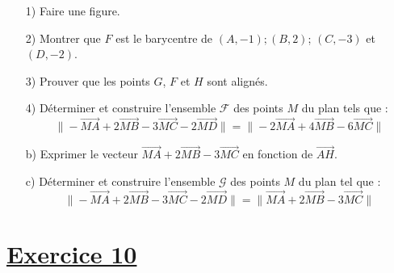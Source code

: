 \documentclass[12pt]{article}
\begin{document}
\begin{enumerate}
    \item[1)] Faire une figure.
    \item[2)] Montrer que \( F \) est le barycentre de \( (A, -1); (B, 2) \); \( (C, -3) \) et \( (D, -2) \).
    \item[3)] Prouver que les points \( G \), \( F \) et \( H \) sont alignés.
    \item[4)] Déterminer et construire l'ensemble \( \mathcal{F} \) des points \( M \) du plan tels que :
    \[
    \| - \overrightarrow{MA} + 2 \overrightarrow{MB} - 3 \overrightarrow{MC} - 2 \overrightarrow{MD} \| = \| - 2 \overrightarrow{MA} + 4 \overrightarrow{MB} - 6 \overrightarrow{MC} \|
    \]
    \item[b)] Exprimer le vecteur \( \overrightarrow{MA} + 2 \overrightarrow{MB} - 3 \overrightarrow{MC} \) en fonction de \( \overrightarrow{AH} \).
    \item[c)] Déterminer et construire l'ensemble \( \mathcal{G} \) des points \( M \) du plan tel que :
    \[
    \| -\overrightarrow{MA} + 2 \overrightarrow{MB} - 3 \overrightarrow{MC} - 2 \overrightarrow{MD} \| = \| \overrightarrow{MA} + 2 \overrightarrow{MB} - 3 \overrightarrow{MC} \|
    \]
\end{enumerate}

\section*{\underline{Exercice 10}}
\end{document}

